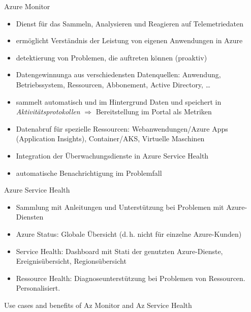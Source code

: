 
\begin{flashcard}[Describe]{Azure Monitor}
    \begin{itemize}
        \item Dienst für das Sammeln, Analysieren und Reagieren auf Telemetriedaten
        \item ermöglicht Verständnis der Leistung von eigenen Anwendungen in Azure
        \item detektierung von Problemen, die auftreten können (proaktiv)
        \item Datengewinnunga aus verschiedensten Datenquellen:\newline
        Anwendung, Betriebssystem, Ressourcen, Abbonement, Active Directory, \ldots
        \item sammelt automatisch und im Hintergrund Daten und speichert in \emph{Aktivitätsprotokollen}\newline
        $\Rightarrow$ Bereitstellung im Portal als Metriken
        \item Datenabruf für spezielle Ressourcen: Webanwendungen/Azure Apps (Application Insights), Container/AKS, Virtuelle Maschinen
        \item Integration der Überwachungsdienste in Azure Service Health
        \item automatische Benachrichtigung im Problemfall
    \end{itemize}

\end{flashcard}

\begin{flashcard}[Describe]{Azure Service Health}
    \begin{itemize}
        \item Sammlung mit Anleitungen und Unterstützung bei Problemen mit Azure-Diensten
        \item Azure Status:\newline
            Globale Übersicht (d.\,h. nicht für einzelne Azure-Kunden)
        \item Service Health:\newline
            Dashboard mit Stati der genutzten Azure-Dienste, Ereignisübersicht, Regionsübersicht
        \item Ressource Health:\newline
            Diagnoseunterstützung bei Problemen von Ressourcen. Personalisiert.
    \end{itemize}

\end{flashcard}

\begin{flashcard}[Understand]{Use cases and benefits of Az Monitor and Az Service Health}

\end{flashcard}
